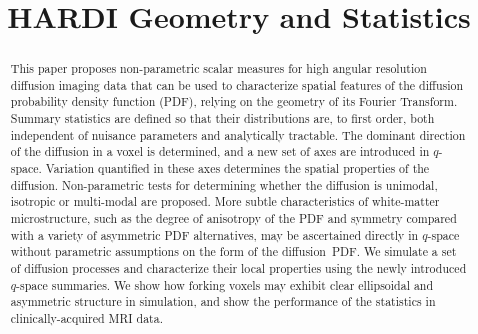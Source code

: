\documentclass[dvips,aoas,preprint]{imsart}
\numberwithin{equation}{section}
\theoremstyle{plain}
\begin{document}
\begin{frontmatter}
\title{HARDI Geometry and Statistics}


\begin{abstract}
This paper proposes non-parametric scalar measures for high angular
resolution diffusion imaging data that can be used to characterize
spatial features of the diffusion probability density function (PDF),
relying on the geometry of its Fourier Transform.  Summary statistics
are defined so that their distributions are, to first order, both
independent of nuisance parameters and analytically tractable.  The
dominant direction of the diffusion in a voxel is determined, and a
new set of axes are introduced in $q$-space.  Variation quantified in
these axes determines the spatial properties of the diffusion.
Non-parametric tests for determining whether the diffusion is
unimodal, isotropic or multi-modal are proposed.  More subtle
characteristics of white-matter microstructure, such as the degree of
anisotropy of the PDF and symmetry compared with a variety of
asymmetric PDF alternatives, may be ascertained directly in $q$-space
without parametric assumptions on the form of the diffusion~PDF.  We
simulate a set of diffusion processes and characterize their local
properties using the newly introduced $q$-space summaries.  We show
how forking voxels may exhibit clear ellipsoidal and asymmetric
structure in simulation, and show the performance of the statistics in
clinically-acquired MRI data.
\end{abstract}


\end{frontmatter}
\end{document}
